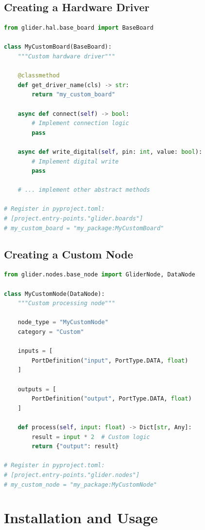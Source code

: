 \documentclass[11pt,a4paper]{article}
\begin{document}
\subsection{Creating a Hardware Driver}

\begin{lstlisting}[language=Python]
from glider.hal.base_board import BaseBoard

class MyCustomBoard(BaseBoard):
    """Custom hardware driver"""

    @classmethod
    def get_driver_name(cls) -> str:
        return "my_custom_board"

    async def connect(self) -> bool:
        # Implement connection logic
        pass

    async def write_digital(self, pin: int, value: bool):
        # Implement digital write
        pass

    # ... implement other abstract methods

# Register in pyproject.toml:
# [project.entry-points."glider.boards"]
# my_custom_board = "my_package:MyCustomBoard"
\end{lstlisting}

\subsection{Creating a Custom Node}

\begin{lstlisting}[language=Python]
from glider.nodes.base_node import GliderNode, DataNode

class MyCustomNode(DataNode):
    """Custom processing node"""

    node_type = "MyCustomNode"
    category = "Custom"

    inputs = [
        PortDefinition("input", PortType.DATA, float)
    ]

    outputs = [
        PortDefinition("output", PortType.DATA, float)
    ]

    def process(self, input: float) -> Dict[str, Any]:
        result = input * 2  # Custom logic
        return {"output": result}

# Register in pyproject.toml:
# [project.entry-points."glider.nodes"]
# my_custom_node = "my_package:MyCustomNode"
\end{lstlisting}

\section{Installation and Usage}
\end{document}
